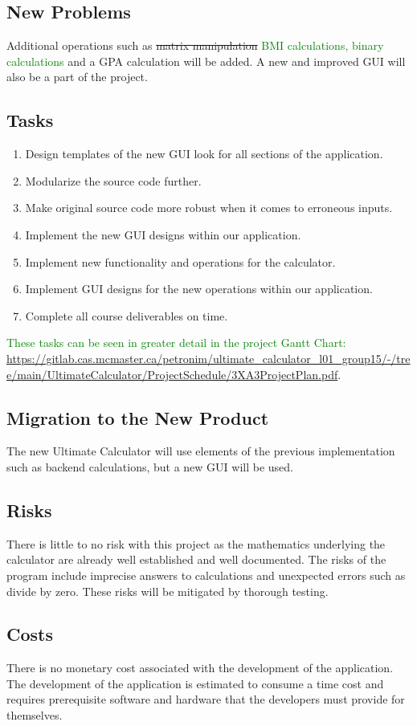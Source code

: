 \documentclass[12pt, titlepage]{article}
\begin{document}
\subsection{New Problems}
Additional operations such as \sout{matrix manipulation} \textcolor{Green}{BMI calculations, binary calculations} and a GPA calculation will be added. A new and improved GUI will also be a part of the project.
\subsection{Tasks}
\begin{enumerate}
    \item Design templates of the new GUI look for all sections of the application.
    \item Modularize the source code further.
    \item Make original source code more robust when it comes to erroneous inputs.
    \item Implement the new GUI designs within our application.
    \item Implement new functionality and operations for the calculator.
    \item Implement GUI designs for the new operations within our application.
    \item Complete all course deliverables on time.
\end{enumerate}

\textcolor{Green}{These tasks can be seen in greater detail in the project Gantt Chart:} \url{https://gitlab.cas.mcmaster.ca/petronim/ultimate_calculator_l01_group15/-/tree/main/UltimateCalculator/ProjectSchedule/3XA3ProjectPlan.pdf}.
\subsection{Migration to the New Product}
The new Ultimate Calculator will use elements of the previous implementation such as backend calculations, but a new GUI will be used.
\subsection{Risks}
There is little to no risk with this project as the mathematics underlying the calculator are already well established and well documented. The risks of the program include imprecise answers to calculations and unexpected errors such as divide by zero. These risks will be mitigated by thorough testing.
\subsection{Costs}
There is no monetary cost associated with the development of the application. The development of the application is estimated to consume a time cost and requires prerequisite software and hardware that the developers must provide for themselves.
\end{document}
